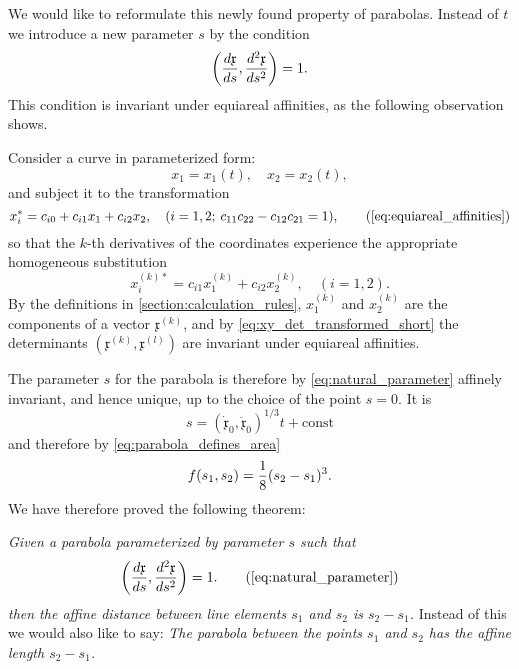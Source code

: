 \documentclass[11pt]{book} \usepackage{amssymb}
\newcommand{\myvec}[1]{\mathfrak{#1}}
\newcommand{\vecx}{\myvec{x}}
\newcommand{\vecderiv}[1]{\dot{\myvec{#1}}}
\newcommand{\vecderivv}[1]{\ddot{\myvec{#1}}}
\begin{document}
We would like to reformulate this newly found property of parabolas. Instead of
$t$ we introduce a new parameter $s$ by the condition
\begin{equation}
  \label{eq:natural_parameter}
  \left({d\vecx\over ds},{d^2\vecx\over ds^2}\right)=1.
\end{equation}
This condition is invariant under equiareal affinities, as the following 
observation shows.

Consider a curve in parameterized form:
\begin{equation}
  \label{eq:parameterized_curve}
  x_1=x_1(t),\quad x_2=x_2(t),
\end{equation}
and subject it to the transformation 
\begin{equation*}
  x_i^*=c_{i0}+c_{i1}x_1+c_{i2}x_2,\quad (i=1,2;\: c_{11}c_{22}-c_{12}c_{21}=1),
  \tag{\ref{eq:equiareal_affinities}}
\end{equation*}
so that the $k$-th derivatives of the coordinates experience the appropriate
homogeneous substitution
\begin{equation}
  \label{eq:deriv_transform}
  x_i^{(k)*}=c_{i1}x_1^{(k)}+c_{i2}x_2^{(k)}, \quad (i=1,2).
\end{equation}
By the definitions in \ref{section:calculation_rules}, $x_1^{(k)}$ and
$x_2^{(k)}$ are the components of a vector $\vecx^{(k)}$, and by 
\eqref{eq:xy_det_transformed_short} the determinants 
$(\vecx^{(k)},\vecx^{(l)})$ are invariant under equiareal affinities.

The parameter $s$ for the parabola is therefore by \eqref{eq:natural_parameter}
affinely invariant, and hence unique, up to the choice of the point $s=0$. It
is
\begin{equation*}
  s=(\vecderiv{x}_0,\vecderivv{x}_0)^{1/3}t+\mbox{const}
\end{equation*}
and therefore by \eqref{eq:parabola_defines_area}
\begin{equation}
  \label{eq:area_by_natural_param}
  f(s_1,s_2)={1\over 8}(s_2-s_1)^3.
\end{equation}
We have therefore proved the following theorem:

{\em Given a parabola parameterized by parameter $s$ such that
  \begin{equation}
    \left({d\vecx\over ds},{d^2\vecx\over ds^2}\right)=1.
    \tag{\ref{eq:natural_parameter}}
  \end{equation}
  then the affine distance between line elements $s_1$ and $s_2$ is $s_2-s_1$.}
Instead of this we would also like to say: {\em The parabola between the points
$s_1$ and $s_2$ has the affine length $s_2-s_1$.}
\end{document}
